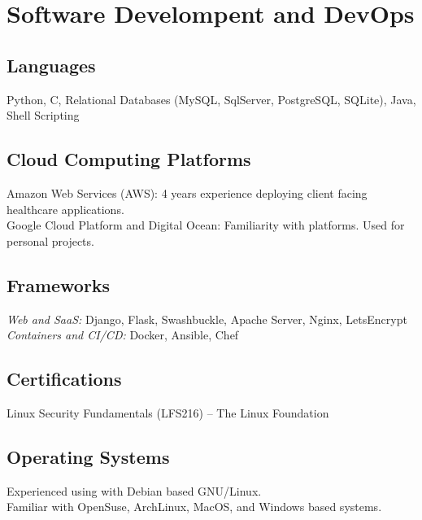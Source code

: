 \section{Software Develompent and DevOps}


\subsection{Languages}
Python,
C,
Relational Databases (MySQL, SqlServer, PostgreSQL, SQLite),
Java,
Shell Scripting

\subsection{Cloud Computing Platforms}
Amazon Web Services (AWS): 4 years experience deploying client facing healthcare applications.\\
Google Cloud Platform and Digital Ocean: Familiarity with platforms. Used for personal projects.

\subsection{Frameworks}
{\it Web and SaaS:} Django, Flask, Swashbuckle, Apache Server, Nginx, LetsEncrypt\\
{\it Containers and CI/CD:} Docker, Ansible, Chef


\subsection{Certifications}
Linux Security Fundamentals (LFS216) -- The Linux Foundation

\subsection{Operating Systems}
Experienced using with Debian based GNU/Linux.\\
Familiar with OpenSuse, ArchLinux, MacOS, and Windows based systems.

